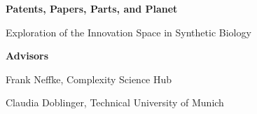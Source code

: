 \documentclass[12pt,a4paper]{article}
\begin{document}
	
	\begin{titlepage}
		\centering
		\vspace*{\fill}
		{\Huge\bfseries Patents, Papers, Parts, and Planet\par}
		\vspace{1cm}
		{\Large Exploration of the Innovation Space in Synthetic Biology\par}
		\vspace{2.5cm}
		{\large\bfseries Advisors\par}
		\vspace{0.4cm}
		{\large Frank Neffke, Complexity Science Hub\par}
		\vspace{0.2cm}
		{\large Claudia Doblinger, Technical University of Munich\par}
		\vspace*{\fill}
	\end{titlepage}
	
	\tableofcontents
	\clearpage
	
	
\end{document}
